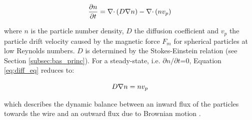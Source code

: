 \begin{equation}
\label{eq:diff_eq}
\centering
\frac{\partial n}{\partial t} = \nabla\cdotp(D\nabla n)-\nabla\cdotp(n v_{p})
\end{equation}

where $n$ is the particle number density, $D$ the diffusion coefficient and $v_{p}$ the particle drift velocity caused by the magnetic force $F_{m}$ for spherical particles at low Reynolds numbers. $D$ is determined by the Stokes-Einstein relation (see Section \ref{subsec:bas_princ}). For a steady-state, i.e. ${\partial n}/{\partial t}$=0, Equation \ref{eq:diff_eq} reduces to:

\begin{equation}
\label{eq:diff_eq}
\centering
 D\nabla n = n v_{p}
\end{equation}

which describes the dynamic balance between an inward flux of the particles towards the wire and an outward flux due to Brownian motion \cite{fletcher1991fine}. 



% 


% 
% 
% 

